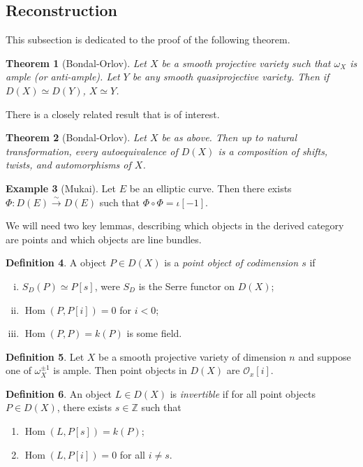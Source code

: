 \documentclass{amsart}
\newtheorem{thm}{Theorem}[section]
\theoremstyle{definition}
\newtheorem{defn}[thm]{Definition}
\newtheorem{exm}[thm]{Example}
\theoremstyle{remark}
\theoremstyle{plain}
\theoremstyle{definition}
\theoremstyle{remark}
\newcommand{\Z}{\mathbb{Z}}
\newcommand{\mc}[1]{\mathcal{#1}}
\newcommand{\1}{\mathbf{1}}
\newcommand{\2}{\mathbf{2}}
\newcommand{\3}{\mathbf{3}}
\DeclareMathOperator{\Hom}{Hom}
\begin{document}
\subsection{Reconstruction}

This subsection is dedicated to the proof of the following theorem.

\begin{thm}[Bondal-Orlov]
    Let $X$ be a smooth projective variety such that $\omega_X$ is ample (or anti-ample). Let $Y$ be any smooth quasiprojective variety. Then if $D(X) \simeq D(Y)$, $X \simeq Y$.
\end{thm}

There is a closely related result that is of interest.
\begin{thm}[Bondal-Orlov]
    Let $X$ be as above. Then up to natural transformation, every autoequivalence of $D(X)$ is a composition of shifts, twists, and automorphisms of $X$.
\end{thm}

\begin{exm}[Mukai]
    Let $E$ be an elliptic curve. Then there exists $\Phi \colon D(E) \xrightarrow{\sim} D(E)$ such that $\Phi \circ \Phi = \iota [-1]$.
\end{exm}

We will need two key lemmas, describing which objects in the derived category are points and which objects are line bundles.

\begin{defn}
    A object $P \in D(X)$ is a \textit{point object of codimension $s$} if
    \begin{enumerate}[(i)]
        \item $S_D(P) \simeq P[s]$, were $S_D$ is the Serre functor on $D(X)$;
        \item $\Hom(P, P[i]) = 0$ for $i < 0$;
        \item $\Hom(P, P) = k(P)$ is some field.
    \end{enumerate}
\end{defn}

\begin{defn}
    Let $X$ be a smooth projective variety of dimension $n$ and suppose one of $\omega_X^{\pm 1}$ is ample. Then point objects in $D(X)$ are $\mc{O}_x[i]$.
\end{defn}

\begin{defn}
    An object $L \in D(X)$ is \textit{invertible} if for all point objects $P \in D(X)$, there exists $s \in \Z$ such that
    \begin{enumerate}
        \item $\Hom(L, P[s]) = k(P)$;
        \item $\Hom(L, P[i]) = 0$ for all $i \neq s$.
    \end{enumerate}
\end{defn}
\end{document}
